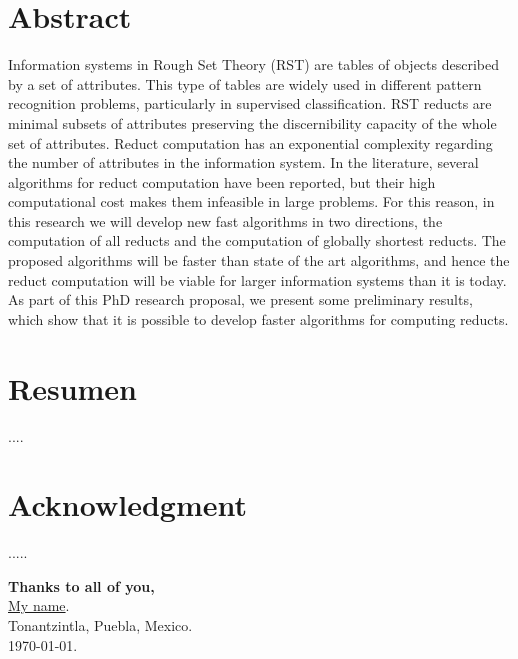 \documentclass[letterpaper, twoside, openright, 12pt]{book}%
\begin{document}






\frontmatter
\doublespacing

\chapter*{Abstract} 

	Information systems in Rough Set Theory (RST) are tables of objects described by a set of attributes. This type of tables are widely used in different pattern recognition problems, particularly in supervised classification. RST reducts are minimal subsets of attributes preserving the discernibility capacity of the whole set of attributes. Reduct computation has an exponential complexity regarding the number of attributes in the information system. In the literature, several	algorithms for reduct computation have been reported, but their high computational cost makes them infeasible in large problems. For this reason, in this research we will develop new fast algorithms in two directions, the computation of all reducts and the computation of globally shortest reducts. The proposed algorithms will be faster than state of the art algorithms, and hence 
		the reduct computation will be viable for larger information systems than it is today. As part of this 
		PhD research proposal, we present some preliminary results, which show that it is possible to develop
		faster algorithms for computing reducts.


\chapter*{Resumen} 
\onehalfspacing
....


\chapter*{Acknowledgment} 
\onehalfspacing

.....

\begin{flushright}
\singlespace  
\textbf{Thanks to all of you,}\\ \href{https://}{My name}. \\ Tonantzintla, Puebla, Mexico.\\ \INAOEDate\today.
\end{flushright} 
\end{document}
